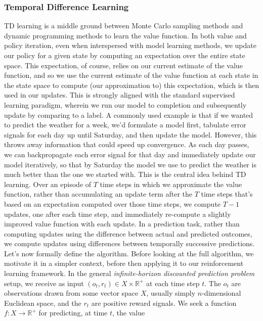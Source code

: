 \documentclass{article}
\begin{document}
\subsubsection{Temporal Difference Learning}
TD learning is a middle ground between Monte Carlo sampling methods and dynamic programming methods to learn the value function. In both value and policy iteration, even when interspersed with model learning methods, we update our policy for a given state by computing an expectation over the entire state space. This expectation, of course, relies on our current estimate of the value function, and so we use the current estimate of the value function at each state in the state space to compute (our approximation to) this expectation, which is then used in our updates. This is strongly aligned with the standard supervised learning paradigm, wherein we run our model to completion and subsequently update by comparing to a label. A commonly used example is that if we wanted to predict the weather for a week, we'd formulate a model first, tabulate error signals for each day up until Saturday, and then update the model.
\newline \newline
However, this throws away information that could speed up convergence. As each day passes, we can backpropagate each error signal for that day and immediately update our model iteratively, so that by Saturday the model we use to predict the weather is much better than the one we started with. This is the central idea behind TD learning. Over an episode of $ T $ time steps in which we approximate the value function, rather than accumulating an update term after the $ T $ time steps that's based on an expectation computed over those time steps, we compute $ T - 1 $ updates, one after each time step, and immediately re-compute a slightly improved value function with each update. In a prediction task, rather than computing updates using the difference between actual and predicted outcomes, we compute updates using differences between temporally successive predictions. Let's now formally define the algorithm.
\newline \newline
Before looking at the full algorithm, we motivate it in a simpler context, before then applying it to our reinforcement learning framework. In the general \textit{infinite-horizon discounted prediction problem} setup, we receive as input $ (o_t, r_t) \in X \times \mathbb{R}^+ $ at each time step $ t $. The $ o_t $ are observations drawn from some vector space $ X $, usually simply $ n $-dimensional Euclidean space, and the $ r_t $ are positive reward signals. We seek a function $ f: X \rightarrow \mathbb{R}^+ $ for predicting, at time $ t $, the value
\end{document}
